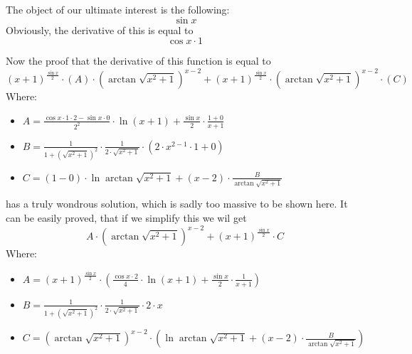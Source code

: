 \documentclass{article}
\begin{document}
The object of our ultimate interest is the following:
\begin{equation}
\sin x 
\end{equation}
Obviously, the derivative of this is equal to
\begin{equation}
\cos x \cdot 1 
\end{equation}

Now the proof that the derivative of this function is equal to
\begin{equation}
\left( x + 1 \right) ^{\frac{\sin x }{2 } } \cdot \left( A \right) \cdot \left( \arctan \sqrt {x ^{2 } + 1 } \right) ^{x - 2 } + \left( x + 1 \right) ^{\frac{\sin x }{2 } } \cdot \left( \arctan \sqrt {x ^{2 } + 1 } \right) ^{x - 2 } \cdot \left( C \right) 
\end{equation}
Where:
\begin{itemize}
	\item $A = \frac{\cos x \cdot 1 \cdot 2 - \sin x \cdot 0 }{2 ^{2 } } \cdot \ln \left( x + 1 \right) + \frac{\sin x }{2 } \cdot \frac{1 + 0 }{x + 1 } $
	\item $B = \frac{1 }{1 + \left( \sqrt {x ^{2 } + 1 } \right) ^{2 } } \cdot \frac{1 }{2 \cdot \sqrt {x ^{2 } + 1 } } \cdot \left( 2 \cdot x ^{2 - 1 } \cdot 1 + 0 \right) $
	\item $C = \left( 1 - 0 \right) \cdot \ln \arctan \sqrt {x ^{2 } + 1 } + \left( x - 2 \right) \cdot \frac{B }{\arctan \sqrt {x ^{2 } + 1 } } $
\end{itemize}

has a truly wondrous solution, which is sadly too massive to be shown here.
It can be easily proved, that if we simplify this we wil get
\begin{equation}
A \cdot \left( \arctan \sqrt {x ^{2 } + 1 } \right) ^{x - 2 } + \left( x + 1 \right) ^{\frac{\sin x }{2 } } \cdot C 
\end{equation}
Where:
\begin{itemize}
	\item $A = \left( x + 1 \right) ^{\frac{\sin x }{2 } } \cdot \left( \frac{\cos x \cdot 2 }{4 } \cdot \ln \left( x + 1 \right) + \frac{\sin x }{2 } \cdot \frac{1 }{x + 1 } \right) $
	\item $B = \frac{1 }{1 + \left( \sqrt {x ^{2 } + 1 } \right) ^{2 } } \cdot \frac{1 }{2 \cdot \sqrt {x ^{2 } + 1 } } \cdot 2 \cdot x $
	\item $C = \left( \arctan \sqrt {x ^{2 } + 1 } \right) ^{x - 2 } \cdot \left( \ln \arctan \sqrt {x ^{2 } + 1 } + \left( x - 2 \right) \cdot \frac{B }{\arctan \sqrt {x ^{2 } + 1 } } \right) $
\end{itemize}
\end{document}
